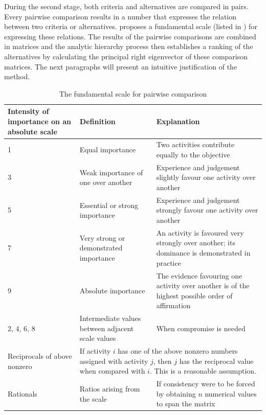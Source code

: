 During the second stage, both criteria and alternatives are compared in pairs. Every pairwise comparison results in a number that expresses the relation between two criteria or alternatives. \citet{Saaty:1990} proposes a fundamental scale (listed in ) for expressing these relations. The results of the pairwise comparisons are combined in matrices and the analytic hierarchy process then establishes a ranking of the alternatives by calculating the principal right eigenvector of these comparison matrices. The next paragraphs will present an intuitive justification of the method.

\begin{table}
    \begin{center}
        \begin{tabular}{p{2.5cm}p{4cm}p{6cm}}
            \hline
            Intensity of importance on an absolute scale & Definition & Explanation \\
            \hline
            1 & Equal importance & Two activities contribute equally to the objective \\
            3 & Weak importance of one over another & Experience and judgement slightly favour one activity over another \\
            5 & Essential or strong importance & Experience and judgement strongly favour one activity over another \\
            7 & Very strong or demonstrated importance & An activity is favoured very strongly over another; its dominance is  demonstrated in practice \\
            9 & Absolute importance & The evidence favouring one activity over another is of the highest possible order of affirmation \\
            2, 4, 6, 8 & Intermediate values between adjacent scale values & When compromise is needed \\
            Reciprocals of above nonzero & \multicolumn{2}{p{10cm}}{If activity $i$ has one of the above nonzero numbers assigned with activity $j$, then $j$ has the reciprocal value when compared with $i$. This is a reasonable assumption.} \\
            Rationals & Ratios arising from the scale & If consistency were to be forced by obtaining $n$ numerical values to span the matrix \\
            \hline
        \end{tabular}
        \caption{The fundamental scale for pairwise comparison\cite{Saaty:1980, Saaty:1990}}
        \label{tab:ahp-scale}
    \end{center}
\end{table}

